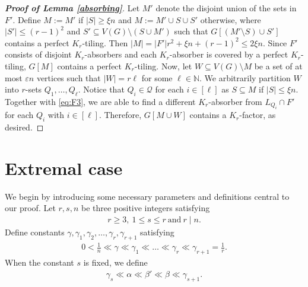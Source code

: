 \documentclass[11pt, a4paper]{article}
\theoremstyle{definition}
\newcommand{\eps}{\varepsilon}
\newcommand{\<}{\subseteq}
\begin{document}
\begin{proof}[\bf Proof of Lemma \ref{absorbing}]
Let $M'$ denote the disjoint union of the sets in $F'$. Define $M:=M'$ if $|S|\geq \xi n$ and $M:=M'\cup S\cup S'$ otherwise, where $|S'|\leq (r-1)^2$ and $S'\subseteq V(G)\setminus (S\cup M')$ such that $G[(M'\setminus S)\cup S']$ contains a perfect $K_r$-tiling. %
Then $|M|=|F'|r^2+\xi n+(r-1)^2\leq 2\xi n.$ Since $F'$ consists of disjoint $K_r$-absorbers and each $K_r$-absorber is covered by a perfect $K_r$-tiling, $G[M]$ contains a perfect $K_r$-tiling. Now, let $W\subseteq V(G)\setminus M$ be a set of at most $\eps n$ vertices such that $|W|=r\ell$ for some $\ell\in \mathbb{N}$. We arbitrarily partition $W$ into $r$-sets $Q_1,\ldots,Q_{\ell}$. Notice that $Q_i\in \mathcal{Q}$ for each $i\in [\ell]$ as $S\subseteq M$ if $|S|\leq \xi n$. Together with \eqref{eq:F3}, we are able to find a different $K_r$-absorber from $L_{Q_i}\cap F'$ for each $Q_i$ with $i\in [\ell]$. %
Therefore, $G[M\cup W]$ contains a $K_r$-factor, as desired. 
\end{proof}



\section{Extremal case}\label{section5}
We begin by introducing some necessary parameters and definitions central to our proof. Let $r,s,n$ be three positive integers satisfying 
\begin{align}\label{eq:p1}
    r\ge 3,\ 1\le s\le r\ \text{and}\ r\mid n.
\end{align}
Define constants $\gamma, \gamma_1,\gamma_2,\dots,\gamma_r, \gamma_{r+1}$ satisfying 
\begin{align}\label{eq:p2}
    0<\frac{1}{n}\ll \gamma \ll \gamma_1\ll \dots \ll \gamma_r\ll\gamma_{r+1}=\frac{1}{r}.
\end{align}
When the constant $s$ is fixed, we define 
\begin{align}\label{eq:p3}
    \gamma_s\ll \alpha \ll\beta'\ll\beta\ll \gamma_{s+1}.
\end{align}


\end{document}
